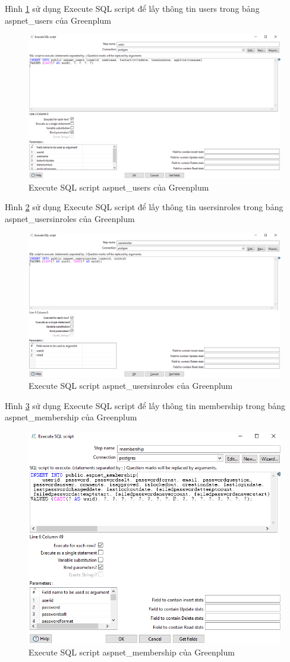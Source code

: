 \documentclass[14pt]{article}
\begin{document}
Hình \ref{fig:gusers} sử dụng Execute SQL script để lấy thông tin users trong bảng aspnet\_users của Greenplum


\begin{figure}
    \centering
    \includegraphics[width=0.5\linewidth]{gusers.png}
     \caption{Execute SQL script aspnet\_users của Greenplum}
    \label{fig:gusers}
\end{figure}

Hình \ref{fig:gusersinroles} sử dụng Execute SQL script để lấy thông tin usersinroles trong bảng aspnet\_usersinroles của Greenplum


\begin{figure}
    \centering
    \includegraphics[width=0.5\linewidth]{images/gusersinroles.png}
    \caption{Execute SQL script aspnet\_usersinroles của Greenplum}
    \label{fig:gusersinroles}
\end{figure}

Hình \ref{fig:gmembership} sử dụng Execute SQL script để lấy thông tin membership trong bảng aspnet\_membership của Greenplum


\begin{figure}
    \centering
    \includegraphics[width=0.5\linewidth]{images/gmembership.png}
     \caption{Execute SQL script aspnet\_membership của Greenplum}
    \label{fig:gmembership}
\end{figure}
\end{document}
